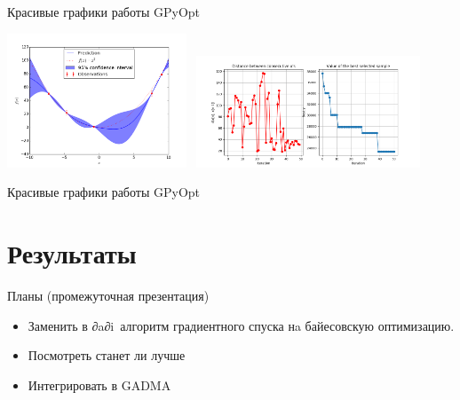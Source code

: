 \documentclass[
  russian,
  ignorenonframetext,
]{beamer}
\providecommand{\tightlist}{%
  \setlength{\itemsep}{0pt}\setlength{\parskip}{0pt}}
\begin{document}
\begin{frame}{Красивые графики работы GPyOpt}
\protect\hypertarget{ux43aux440ux430ux441ux438ux432ux44bux435-ux433ux440ux430ux444ux438ux43aux438-ux440ux430ux431ux43eux442ux44b-gpyopt}{}

\includegraphics[width=0.4\textwidth,height=\textheight]{./pics/bayes.png}
~\includegraphics[width=0.5\textwidth,height=\textheight]{./pics/conv.png}

\end{frame}

\begin{frame}{Красивые графики работы GPyOpt}
\end{frame}

\hypertarget{ux440ux435ux437ux443ux43bux44cux442ux430ux442ux44b}{%
\section{Результаты}\label{ux440ux435ux437ux443ux43bux44cux442ux430ux442ux44b}}

\begin{frame}{Планы (промежуточная презентация)}
\protect\hypertarget{ux43fux43bux430ux43dux44b-ux43fux440ux43eux43cux435ux436ux443ux442ux43eux447ux43dux430ux44f-ux43fux440ux435ux437ux435ux43dux442ux430ux446ux438ux44f}{}

\begin{itemize}
\tightlist
\item
  Заменить в ∂a∂i\ алгоритм градиентного спуска нa байесовскую
  оптимизацию.
\item
  Посмотреть станет ли лучше
\item
  Интегрировать в GADMA
\end{itemize}

\end{frame}
\end{document}
